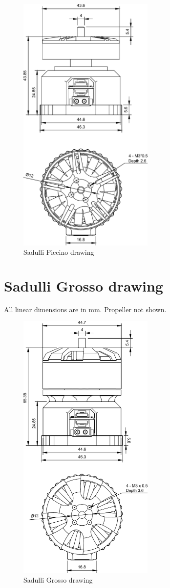 \begin{figure}[!hbt]
    \centerline{\includegraphics[width=0.6\textwidth]{figures/sadulli_piccino}}
    \caption{Sadulli Piccino drawing}
\end{figure}

\newpage

\section{Sadulli Grosso drawing}
All linear dimensions are in mm. Propeller not shown.

\begin{figure}[!hbt]
    \centerline{\includegraphics[width=0.6\textwidth]{figures/sadulli_grosso}}
    \caption{Sadulli Grosso drawing}
\end{figure}
